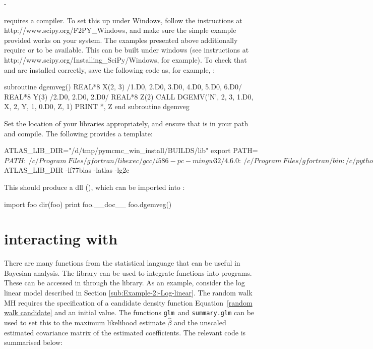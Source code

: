 -\documentclass[article]{jss}
\begin{document}
 requires a  compiler. To set this up
under Windows, follow the instructions at
http://www.scipy.org/F2PY\_Windows, and make sure the simple example
provided works on your system. The examples presented above
additionally require  or \mbox{} to be available.
This can be built under windows (see instructions at \linebreak
http://www.scipy.org/Installing\_SciPy/Windows, for example). To check
that  and \mbox{} are installed correctly, save
the following code as, for example, :


\begin{Code}
subroutine dgemveg()
  REAL*8 X(2, 3) /1.D0, 2.D0, 3.D0, 4.D0, 5.D0, 6.D0/
  REAL*8 Y(3) /2.D0, 2.D0, 2.D0/
  REAL*8 Z(2)
  CALL DGEMV('N', 2, 3, 1.D0, X, 2, Y, 1, 0.D0, Z, 1)
  PRINT *, Z
end subroutine dgemveg
\end{Code}



Set the location of your  libraries appropriately, and ensure
that  is in your path and compile. The following provides a
template:


\begin{Code}
ATLAS_LIB_DIR="/d/tmp/pymcmc_win_install/BUILDS/lib"
export PATH=${PATH}:\
/c/Program\ Files/gfortran/libexec/gcc/i586-pc-mingw32/4.6.0:\
/c/Program\ Files/gfortran/bin:/c/python26 
python /c/Python26/Scripts/f2py.py -c -m foo \
   --fcompiler=gfortran \
   blas_eg.f90 -L${ATLAS_LIB_DIR} -lf77blas -latlas -lg2c 
\end{Code}


This should produce a  dll (\code{foo.pyd}), which can be imported
into \proglang{Python}:


\begin{Code}
import foo
dir(foo) 
print foo.__doc__
foo.dgemveg() 
\end{Code}

\section[PyMCMC interacting with R]{ 
interacting with }
\label{sec:PyMCMC-interacting-with}

There are many functions from the \proglang{R} statistical language
\citep{R} that can be useful in Bayesian analysis. The 
\citep{gautier:_rpy2}  library can be used to
integrate  functions into  programs. These can
be accessed in \pkg{PyMCMC} through the \pkg{RPy2} \proglang{Python}
library. As an example, consider the log linear model described in
Section \ref{sub:Example-2:-Log-linear}. The random walk MH requires
the specification of a candidate density function Equation~\ref{random
  walk candidate} and an initial value. The \proglang{R} functions
\texttt{glm }and \texttt{summary.glm} can be used to set this to the
maximum likelihood estimate $\hat{\beta}$ and the unscaled estimated
covariance matrix of the estimated coefficients. The relevant code is
summarised below:
\end{document}
